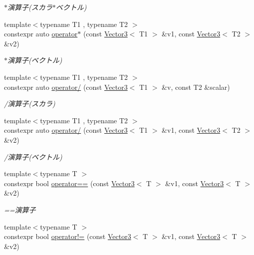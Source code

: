 \begin{DoxyCompactItemize}
\begin{DoxyCompactList}\small\item\em $\ast$演算子(スカラ$\ast$ベクトル) \end{DoxyCompactList}\item 
{\footnotesize template$<$typename T1 , typename T2 $>$ }\\constexpr auto \mbox{\hyperlink{namespacesaki_a44134827291df1234e04cbd1837a05ac}{operator$\ast$}} (const \mbox{\hyperlink{classsaki_1_1_vector3}{Vector3}}$<$ T1 $>$ \&v1, const \mbox{\hyperlink{classsaki_1_1_vector3}{Vector3}}$<$ T2 $>$ \&v2)
\begin{DoxyCompactList}\small\item\em $\ast$演算子(ベクトル) \end{DoxyCompactList}\item 
{\footnotesize template$<$typename T1 , typename T2 $>$ }\\constexpr auto \mbox{\hyperlink{namespacesaki_abbbafb6bb5e04aa715db728862e079a8}{operator/}} (const \mbox{\hyperlink{classsaki_1_1_vector3}{Vector3}}$<$ T1 $>$ \&v, const T2 \&scalar)
\begin{DoxyCompactList}\small\item\em /演算子(スカラ) \end{DoxyCompactList}\item 
{\footnotesize template$<$typename T1 , typename T2 $>$ }\\constexpr auto \mbox{\hyperlink{namespacesaki_a7af3750f8a88499eca7784ad18753111}{operator/}} (const \mbox{\hyperlink{classsaki_1_1_vector3}{Vector3}}$<$ T1 $>$ \&v1, const \mbox{\hyperlink{classsaki_1_1_vector3}{Vector3}}$<$ T2 $>$ \&v2)
\begin{DoxyCompactList}\small\item\em /演算子(ベクトル) \end{DoxyCompactList}\item 
{\footnotesize template$<$typename T $>$ }\\constexpr bool \mbox{\hyperlink{namespacesaki_a29747cf04c5a821834f7a1fea39e4050}{operator==}} (const \mbox{\hyperlink{classsaki_1_1_vector3}{Vector3}}$<$ T $>$ \&v1, const \mbox{\hyperlink{classsaki_1_1_vector3}{Vector3}}$<$ T $>$ \&v2)
\begin{DoxyCompactList}\small\item\em ==演算子 \end{DoxyCompactList}\item 
{\footnotesize template$<$typename T $>$ }\\constexpr bool \mbox{\hyperlink{namespacesaki_a49b3805c2b97e135606939b8d64eca20}{operator!=}} (const \mbox{\hyperlink{classsaki_1_1_vector3}{Vector3}}$<$ T $>$ \&v1, const \mbox{\hyperlink{classsaki_1_1_vector3}{Vector3}}$<$ T $>$ \&v2)

\end{DoxyCompactItemize}
